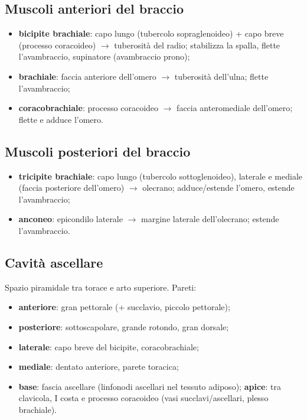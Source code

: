 \subsection{Muscoli anteriori del braccio}
\begin{itemize}
  \item \textbf{bicipite brachiale}: capo lungo (tubercolo sopraglenoideo) + capo breve (processo
    coracoideo) $\rightarrow$ tuberosità del radio; stabilizza la spalla, flette l'avambraccio,
    supinatore (avambraccio prono);
  \item \textbf{brachiale}: faccia anteriore dell'omero $\rightarrow$ tuberosità dell'ulna; flette
    l'avambraccio;
  \item \textbf{coracobrachiale}: processo coracoideo $\rightarrow$ faccia anteromediale dell'omero;
    flette e adduce l'omero.
\end{itemize}

\subsection{Muscoli posteriori del braccio}
\begin{itemize}
  \item \textbf{tricipite brachiale}: capo lungo (tubercolo sottoglenoideo), laterale e mediale
    (faccia posteriore dell'omero) $\rightarrow$ olecrano; adduce/estende l'omero, estende
    l'avambraccio;
  \item \textbf{anconeo}: epicondilo laterale $\rightarrow$ margine laterale dell'olecrano; estende
    l'avambraccio.
\end{itemize}

\subsection{Cavità ascellare}
Spazio piramidale tra torace e arto superiore. Pareti:
\begin{itemize}
  \item \textbf{anteriore}: gran pettorale (+ succlavio, piccolo pettorale);
  \item \textbf{posteriore}: sottoscapolare, grande rotondo, gran dorsale;
  \item \textbf{laterale}: capo breve del bicipite, coracobrachiale;
  \item \textbf{mediale}: dentato anteriore, parete toracica;
  \item \textbf{base}: fascia ascellare (linfonodi ascellari nel tessuto adiposo); \textbf{apice}:
    tra clavicola, I costa e processo coracoideo (vasi succlavi/ascellari, plesso brachiale).
\end{itemize}

